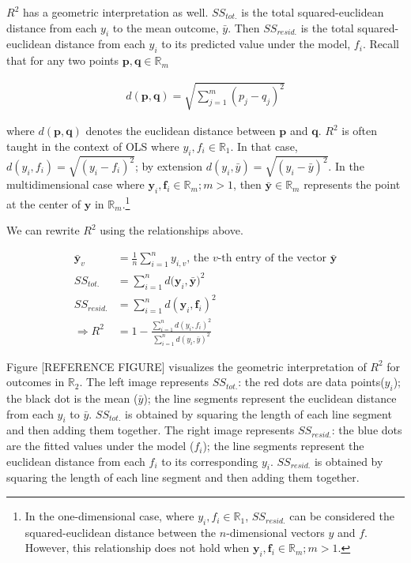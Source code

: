 \documentclass[conference,final,]{IEEEtran}
\begin{document}
\(R^2\) has a geometric interpretation as well. \(SS_{tot.}\) is the
total squared-euclidean distance from each \(y_i\) to the mean outcome,
\(\bar{y}\). Then \(SS_{resid.}\) is the total squared-euclidean
distance from each \(y_i\) to its predicted value under the model,
\(f_i\). Recall that for any two points
\(\mathbf{p}, \mathbf{q} \in \mathbb{R}_m\)

\begin{align}
    d(\mathbf{p},\mathbf{q}) = \sqrt{\sum_{j=1}^m{(p_j - q_j)^2}}
\end{align}

where \(d(\mathbf{p}, \mathbf{q})\) denotes the euclidean distance
between \(\mathbf{p}\) and \(\mathbf{q}\). \(R^2\) is often taught in
the context of OLS where \(y_i, f_i \in \mathbb{R}_1\). In that case,
\(d(y_i, f_i) = \sqrt{(y_i - f_i)^2}\); by extension
\(d(y_i, \bar{y}) = \sqrt{(y_i - \bar{y})^2}\). In the multidimensional
case where \(\mathbf{y}_i, \mathbf{f}_i \in \mathbb{R}_m; m > 1\), then
\(\bar{\mathbf{y}} \in \mathbb{R}_m\) represents the point at the center
of \(\mathbf{y}\) in \(\mathbb{R}_m\).\footnote{In the one-dimensional
  case, where \(y_i , f_i \in \mathbb{R}_1\), \(SS_{resid.}\) can be
  considered the squared-euclidean distance between the
  \(n\)-dimensional vectors \(y\) and \(f\). However, this relationship
  does not hold when
  \(\mathbf{y}_i , \mathbf{f}_i \in \mathbb{R}_m ; m > 1\).}

We can rewrite \(R^2\) using the relationships above.

\begin{align}
    \bar{\mathbf{y}}_v &= \frac{1}{n} \sum_{i=1}^{n} y_{i,v} 
      \text{, the $v$-th entry of the vector $\bar{\mathbf{y}}$} \\ 
    SS_{tot.} &= \sum_{i=1}^n{d(\mathbf{y}_i, \bar{\mathbf{y}}})^2\\
    SS_{resid.} &= \sum_{i=1}^n{d(\mathbf{y}_i, \mathbf{f}_i)^2}\\
    \Rightarrow R^2 &= 1 - \frac{\sum_{i=1}^n{d(y_i, f_i)^2}}{\sum_{i=1}^n{d(y_i, \bar{y})^2}}
\end{align}

Figure {[}REFERENCE FIGURE{]} visualizes the geometric interpretation of
\(R^2\) for outcomes in \(\mathbb{R}_2\). The left image represents
\(SS_{tot.}\): the red dots are data points(\(y_i\)); the black dot is
the mean (\(\bar{y}\)); the line segments represent the euclidean
distance from each \(y_i\) to \(\bar{y}\). \(SS_{tot.}\) is obtained by
squaring the length of each line segment and then adding them together.
The right image represents \(SS_{resid.}\): the blue dots are the fitted
values under the model (\(f_i\)); the line segments represent the
euclidean distance from each \(f_i\) to its corresponding \(y_i\).
\(SS_{resid.}\) is obtained by squaring the length of each line segment
and then adding them together.
\end{document}
